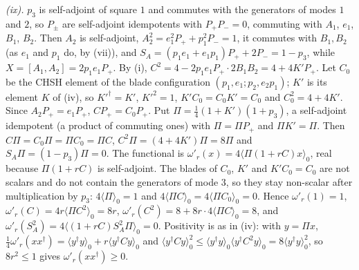\emph{(ix).} $p_{3}$ is self-adjoint of square $1$ and commutes with the generators of modes $1$ and $2$, so $P_{\pm}$ are self-adjoint idempotents with $P_{+}P_{-} = 0$, commuting with $A_{1}$, $e_{1}$, $B_{1}$, $B_{2}$. Then $A_{2}$ is self-adjoint, $A_{2}^{2} = e_{1}^{2}P_{+} + p_{1}^{2}P_{-} = 1$, it commutes with $B_{1}, B_{2}$ (as $e_{1}$ and $p_{1}$ do, by (vii)), and $S_{A} = (p_{1}e_{1} + e_{1}p_{1})P_{+} + 2P_{-} = 1 - p_{3}$, while $X = [A_{1},A_{2}] = 2p_{1}e_{1}P_{+}$. By (i), $C^{2} = 4 - 2p_{1}e_{1}P_{+} \cdot 2B_{1}B_{2} = 4 + 4K'P_{+}$. Let $C_{0}$ be the CHSH element of the blade configuration $(p_{1}, e_{1}; p_{2}, e_{2}p_{1})$; $K'$ is its element $K$ of (iv), so $K'^{\dagger} = K'$, $K'^{2} = 1$, $K'C_{0} = C_{0}K' = C_{0}$ and $C_{0}^{2} = 4 + 4K'$. Since $A_{2}P_{+} = e_{1}P_{+}$, $CP_{+} = C_{0}P_{+}$. Put $\Pi = \tfrac14(1 + K')(1 + p_{3})$, a self-adjoint idempotent (a product of commuting ones) with $\Pi = \Pi P_{+}$ and $\Pi K' = \Pi$. Then $C\Pi = C_{0}\Pi = \Pi C_{0} = \Pi C$, $C^{2}\Pi = (4 + 4K')\Pi = 8\Pi$ and $S_{A}\Pi = (1 - p_{3})\Pi = 0$. The functional is $\omega'_{r}(x) = 4\langle\Pi(1 + rC)x\rangle_{0}$, real because $\Pi(1 + rC)$ is self-adjoint. The blades of $C_{0}$, $K'$ and $K'C_{0} = C_{0}$ are not scalars and do not contain the generators of mode $3$, so they stay non-scalar after multiplication by $p_{3}$: $4\langle\Pi\rangle_{0} = 1$ and $4\langle\Pi C\rangle_{0} = 4\langle\Pi C_{0}\rangle_{0} = 0$. Hence $\omega'_{r}(1) = 1$, $\omega'_{r}(C) = 4r\langle\Pi C^{2}\rangle_{0} = 8r$, $\omega'_{r}(C^{2}) = 8 + 8r \cdot 4\langle\Pi C\rangle_{0} = 8$, and $\omega'_{r}(S_{A}^{2}) = 4\langle(1 + rC)S_{A}^{2}\Pi\rangle_{0} = 0$. Positivity is as in (iv): with $y = \Pi x$, $\tfrac14\omega'_{r}(xx^{\dagger}) = \langle y^{\dagger}y\rangle_{0} + r\langle y^{\dagger}Cy\rangle_{0}$ and $\langle y^{\dagger}Cy\rangle_{0}^{2} \le \langle y^{\dagger}y\rangle_{0}\langle y^{\dagger}C^{2}y\rangle_{0} = 8\langle y^{\dagger}y\rangle_{0}^{2}$, so $8r^{2} \le 1$ gives $\omega'_{r}(xx^{\dagger}) \ge 0$.
